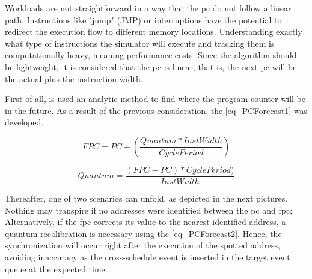Workloads are not straightforward in a way that the \gls{pc} do not follow a linear path. Instructions like "jump" (JMP) or interruptions 
have the potential to redirect the execution flow to different memory locations. Understanding exactly what type of instructions the simulator 
will execute and tracking them is computationally heavy, meaning performance costs. Since the algorithm should be lightweight, it is considered 
that the \gls{pc} is linear, that is, the next \gls{pc} will be the actual plus the instruction width. 

First of all, is used an analytic method to find where the program counter will be in the future. As a result of the previous consideration, 
the \autoref{eq_PCForecast1} was developed.

\begin{equation}
    FPC = PC + \left( \frac{Quantum * InstWidth}{CyclePeriod} \right)
    \label{eq_PCForecast1}
\end{equation}

\begin{equation}
    Quantum = \frac{  \left( FPC - PC \right) * CyclePeriod)}{InstWidth} 
    \label{eq_PCForecast2}
\end{equation}

\hspace*{1cm}

Thereafter, one of two scenarios can unfold, as depicted in the next pictures. Nothing may transpire if no addresses were 
identified between the \gls{pc} and \gls{fpc}; Alternatively, if the \gls{fpc} corrects its value to the nearest identified 
address, a quantum recalibration is necessary using the \autoref{eq_PCForecast2}. Hence, the synchronization will occur right after the 
execution of the spotted address, avoiding inaccuracy as the cross-schedule event is inserted in the target event queue at the expected time.

